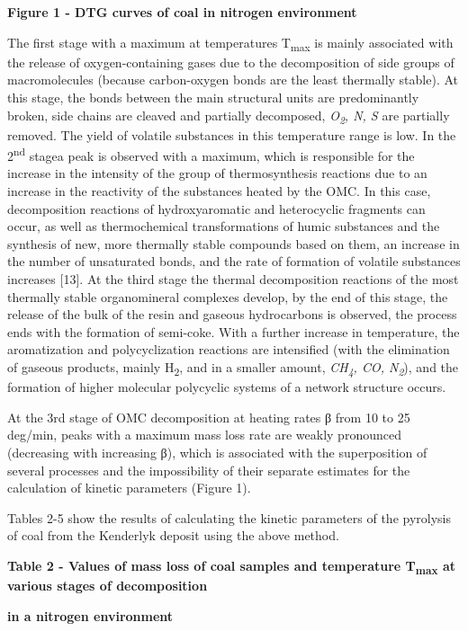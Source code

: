 {\bfseries Figure 1 - DTG curves of coal in nitrogen environment}

The first stage with a maximum at temperatures T\textsubscript{max} is
mainly associated with the release of oxygen-containing gases due to the
decomposition of side groups of macromolecules (because carbon-oxygen
bonds are the least thermally stable). At this stage, the bonds between
the main structural units are predominantly broken, side chains are
cleaved and partially decomposed, \emph{O\textsubscript{2}, N, S} are
partially removed. The yield of volatile substances in this temperature
range is low. In the 2\textsuperscript{nd} stagea peak is observed with
a maximum, which is responsible for the increase in the intensity of the
group of thermosynthesis reactions due to an increase in the reactivity
of the substances heated by the OMC. In this case, decomposition
reactions of hydroxyaromatic and heterocyclic fragments can occur, as
well as thermochemical transformations of humic substances and the
synthesis of new, more thermally stable compounds based on them, an
increase in the number of unsaturated bonds, and the rate of formation
of volatile substances increases {[}13{]}. At the third stage the
thermal decomposition reactions of the most thermally stable
organomineral complexes develop, by the end of this stage, the release
of the bulk of the resin and gaseous hydrocarbons is observed, the
process ends with the formation of semi-coke. With a further increase in
temperature, the aromatization and polycyclization reactions are
intensified (with the elimination of gaseous products, mainly
H\textsubscript{2}, and in a smaller amount, \emph{CH\textsubscript{4},
CO, N\textsubscript{2}}), and the formation of higher molecular
polycyclic systems of a network structure occurs.

At the 3rd stage of OMC decomposition at heating rates β from 10 to 25
deg/min, peaks with a maximum mass loss rate are weakly pronounced
(decreasing with increasing β), which is associated with the
superposition of several processes and the impossibility of their
separate estimates for the calculation of kinetic parameters (Figure 1).

Tables 2-5 show the results of calculating the kinetic parameters of the
pyrolysis of coal from the Kenderlyk deposit using the above method.

{\bfseries Table 2 - Values of mass loss of coal samples and temperature
T\textsubscript{max} at various stages of decomposition}

{\bfseries in a nitrogen environment}

